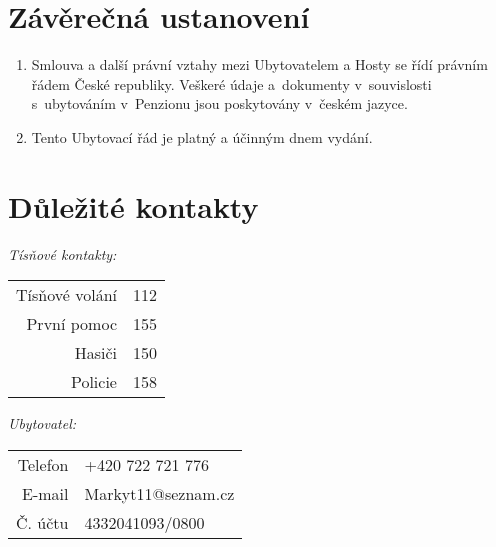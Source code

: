 \documentclass[a4paper]{scrartcl}
\begin{document}
\section{Závěrečná ustanovení}
\begin{enumerate}

  \item
        Smlouva a další právní vztahy mezi Ubytovatelem a Hosty se řídí
        právním řádem České republiky. Veškeré údaje a~dokumenty
        v~souvislosti s~ubytováním v~Penzionu jsou poskytovány v~českém
        jazyce.
  \item
        Tento Ubytovací řád je platný a účinným dnem vydání.
\end{enumerate}

\section{Důležité kontakty}

\begin{multicols}{2}

  \emph{Tísňové kontakty:}\\

  \begin{tabular}{r l}
    Tísňové volání & 112 \\
    První pomoc    & 155 \\
    Hasiči         & 150 \\
    Policie        & 158 \\
  \end{tabular}

  \columnbreak

  \emph{Ubytovatel:}\\

  \begin{tabular}{r l}
    Telefon & +420 722 721 776   \\
    E-mail  & Markyt11@seznam.cz \\
    Č. účtu & 4332041093/0800    \\
  \end{tabular}
\end{multicols}

%
%
%
%
\end{document}
